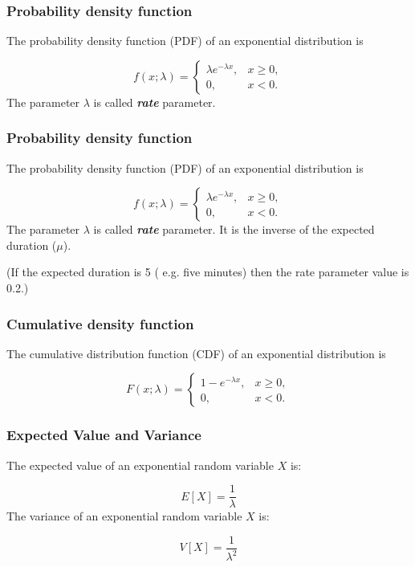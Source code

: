 \documentclass[a4]{beamer}
\begin{document}
\begin{frame}[fragile]
\frametitle{Probability density function}
The probability density function (PDF) of an exponential distribution is

\[
f(x;\lambda) = \begin{cases}
\lambda e^{-\lambda x}, & x \ge 0, \\
0, & x < 0.
\end{cases}\]
The parameter $\lambda$  is called \textbf{\emph{rate}} parameter.
\end{frame}
\begin{frame}[fragile]
	\frametitle{Probability density function}
	The probability density function (PDF) of an exponential distribution is
	
	\[
	f(x;\lambda) = \begin{cases}
	\lambda e^{-\lambda x}, & x \ge 0, \\
	0, & x < 0.
	\end{cases}\]
	The parameter $\lambda$  is called \textbf{\emph{rate}} parameter. It is the inverse of the expected duration ($\mu$).\\ \bigskip
	
	(If the expected duration is 5 ( e.g. five minutes) then the rate parameter value is 0.2.)
\end{frame}

\begin{frame}[fragile]
\frametitle{Cumulative density function}
The cumulative distribution function (CDF) of an exponential distribution is

\[
F(x;\lambda) = \begin{cases}
1-e^{-\lambda x}, & x \ge 0, \\
0, & x < 0.
\end{cases}\]

\end{frame}

\begin{frame}[fragile]
\frametitle{Expected Value and Variance}
The expected value of an exponential random variable $X$ is:

\[
E[X] = \frac{1}{\lambda}\]
The variance of an exponential random variable $X$ is:

\[
V[X] = \frac{1}{\lambda^2}\]

\end{frame}
\end{document}
